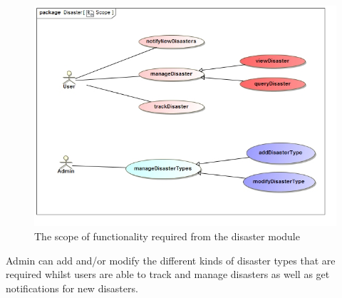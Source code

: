 
\begin{figure}[H]
	\centering
	\includegraphics[width=1.0\textwidth]{../images/funcReq/DisasterScope.jpg}
	\caption{The scope of functionality required from the disaster module \label{overflow}}
\end{figure}

Admin can add and/or modify the different kinds of disaster types that are required whilst users are able to track and manage disasters as well as get notifications for new disasters. 